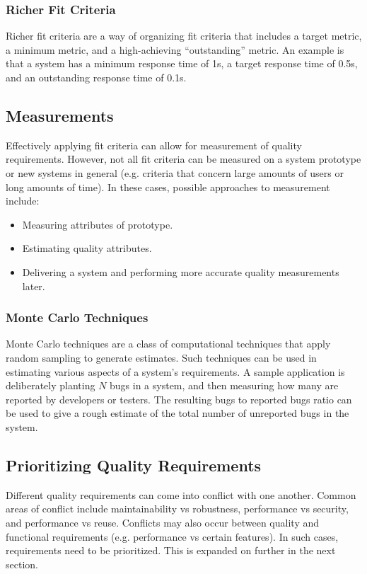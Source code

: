 \documentclass[12pt,titlepage]{article}
\begin{document}
      \subsubsection{Richer Fit Criteria}
        Richer fit criteria are a way of organizing fit criteria that includes a target metric, a minimum metric, and a high-achieving ``outstanding''
        metric. An example is that a system has a minimum response time of 1s, a target response time of 0.5s, and an outstanding response time
        of 0.1s.

    \subsection{Measurements}
      Effectively applying fit criteria can allow for measurement of quality requirements. However, not all fit criteria can be measured on a system
      prototype or new systems in general (e.g. criteria that concern large amounts of users or long amounts of time). In these cases, possible approaches
      to measurement include:
      \begin{itemize}
        \item Measuring attributes of prototype.
        \item Estimating quality attributes.
        \item Delivering a system and performing more accurate quality measurements later.
      \end{itemize}

      \subsubsection{Monte Carlo Techniques}
        Monte Carlo techniques are a class of computational techniques that apply random sampling to generate estimates. Such techniques can be used in
        estimating various aspects of a system's requirements. A sample application is deliberately planting $N$ bugs in a system, and then measuring how
        many are reported by developers or testers. The resulting bugs to reported bugs ratio can be used to give a rough estimate of the total number of
        unreported bugs in the system.

    \subsection{Prioritizing Quality Requirements}
      Different quality requirements can come into conflict with one another. Common areas of conflict include maintainability vs robustness, performance
      vs security, and performance vs reuse. Conflicts may also occur between quality and functional requirements (e.g. performance vs certain features).
      In such cases, requirements need to be prioritized. This is expanded on further in the next section.
\end{document}
